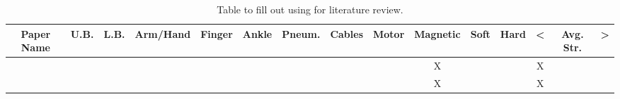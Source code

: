 \begin{landscape}
\begin{table}[]
\centering
\caption{Table to fill out using for literature review.}
\label{my-label}
\begin{tabular}{|c|c|c|c|c|c|c|c|c|c|c|c|c|c|c|}
\hline
\textbf{Paper Name} & \textbf{U.B.} & \textbf{L.B.} & \textbf{Arm/Hand} & \textbf{Finger} & \textbf{Ankle} & \textbf{Pneum.} & \textbf{Cables} & \textbf{Motor} & \textbf{Magnetic} & \textbf{Soft} & \textbf{Hard} & \textbf{\textless} & \textbf{Avg. Str.} & \textbf{\textgreater} \\ \hline
\cite{yanneng2012mathematical} & & & & & & & & & X & & & X & & \\ \hline
\cite{tolou2012modeling} & & & & & & & & & X & & & X & & \\ \hline

\end{tabular}
\end{table}

\end{landscape}
\restoregeometry